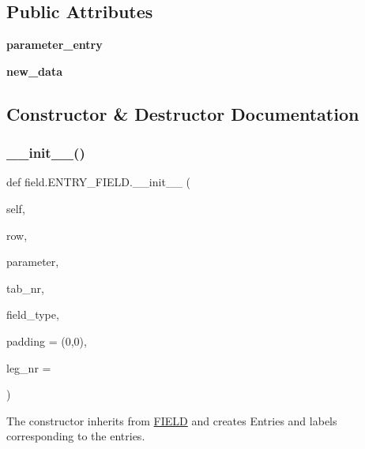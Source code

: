 \subsection*{Public Attributes}
\begin{DoxyCompactItemize}
\item 
\mbox{\label{classfield_1_1ENTRY__FIELD_ad8d12c414c80ebc1dc029c1497e197c8}} 
{\bfseries parameter\+\_\+entry}
\item 
\mbox{\label{classfield_1_1ENTRY__FIELD_a117974a0590e90cf86e9e90af2cc7eff}} 
{\bfseries new\+\_\+data}
\end{DoxyCompactItemize}


\subsection{Constructor \& Destructor Documentation}
\mbox{\label{classfield_1_1ENTRY__FIELD_a9b1f1028d872599a49fc24758320fc96}} 
\subsubsection{\texorpdfstring{\+\_\+\+\_\+init\+\_\+\+\_\+()}{\_\_init\_\_()}}
{\footnotesize\ttfamily def field.\+E\+N\+T\+R\+Y\+\_\+\+F\+I\+E\+L\+D.\+\_\+\+\_\+init\+\_\+\+\_\+ (\begin{DoxyParamCaption}\item[{}]{self,  }\item[{}]{row,  }\item[{}]{parameter,  }\item[{}]{tab\+\_\+nr,  }\item[{}]{field\+\_\+type,  }\item[{}]{padding = {\ttfamily (0,0)},  }\item[{}]{leg\+\_\+nr = {} }\end{DoxyParamCaption})}



The constructor inherits from \hyperlink{classfield_1_1FIELD}{F\+I\+E\+LD} and creates Entries and labels corresponding to the entries. 




